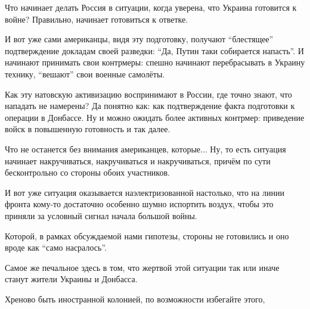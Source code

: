 Что начинает делать Россия в ситуации, когда уверена, что Украина готовится к
войне? Правильно, начинает готовиться к ответке. 

И вот уже сами американцы, видя эту подготовку, получают \enquote{блестящее}
подтверждение докладам своей разведки: \enquote{Да, Путин таки собирается напасть}. И
начинают принимать свои контрмеры: спешно начинают перебрасывать в Украину
технику, \enquote{вешают} свои военные самолёты.

Как эту натовскую активизацию воспринимают в России, где точно знают, что
нападать не намерены? Да понятно как: как подтверждение факта подготовки к
операции в Донбассе. Ну и можно ожидать более активных контрмер: приведение
войск в повышенную готовность и так далее.

Что не останется без внимания американцев, которые... Ну, то есть ситуация
начинает накручиваться, накручиваться и накручиваться, причём по сути
бесконтрольно со стороны обоих участников.

И вот уже ситуация оказывается наэлектризованной настолько, что на линии фронта
кому-то достаточно особенно шумно испортить воздух, чтобы это приняли за
условный сигнал начала большой войны. 

Которой, в рамках обсуждаемой нами гипотезы, стороны не готовились и оно вроде
как \enquote{само насралось}. 

Самое же печальное здесь в том, что жертвой этой ситуации так или иначе станут
жители Украины и Донбасса. 

Хреново быть иностранной колонией, по возможности избегайте этого,
